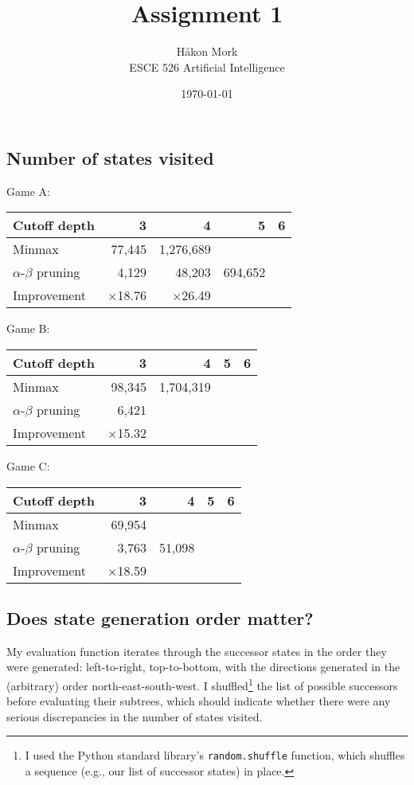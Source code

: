 \documentclass[letterpaper, 12pt]{article}
\title{\textbf{Assignment 1}}
\author{Håkon Mork \\ ESCE 526 Artificial Intelligence}
\date{\today}
\numberwithin{theorem}{section}
\begin{document}
\maketitle
\noindent

\section{}
\subsection{Number of states visited}
Game A:
\begin{table}[h]
	\centering
	\small
	\begin{tabular}{lrrrr}
		Cutoff depth & 3 & 4 & 5 & 6 \\
		\midrule
		Minmax & 77,445 & 1,276,689 & & \\
		$\alpha$-$\beta$ pruning & 4,129 & 48,203 & 694,652 & \\
		\midrule
		Improvement & $\times$18.76 & $\times$26.49
	\end{tabular}
\end{table}

\noindent Game B:
\begin{table}[h]
	\centering
	\small
	\begin{tabular}{lrrrr}
		Cutoff depth & 3 & 4 & 5 & 6 \\
		\midrule
		Minmax & 98,345 & 1,704,319 & & \\
		$\alpha$-$\beta$ pruning & 6,421 & & & \\
		\midrule
		Improvement & $\times$15.32 & & &
	\end{tabular}
\end{table}

\noindent Game C:
\begin{table}[h]
	\centering
	\small
	\begin{tabular}{lrrrr}
		Cutoff depth & 3 & 4 & 5 & 6 \\
		\midrule
		Minmax & 69,954 & & & \\
		$\alpha$-$\beta$ pruning & 3,763 & 51,098 & & \\
		\midrule
		Improvement & $\times$18.59 & & &
	\end{tabular}
\end{table}


\subsection{Does state generation order matter?}
My evaluation function iterates through the successor states in the order they were generated: left-to-right, top-to-bottom, with the directions generated in the (arbitrary) order north-east-south-west. I shuffled\footnote{I used the Python standard library's \texttt{random.shuffle} function, which shuffles a sequence (e.g., our list of successor states) in place.} the list of possible successors before evaluating their subtrees, which should indicate whether there were any serious discrepancies in the number of states visited. 
\end{document}
